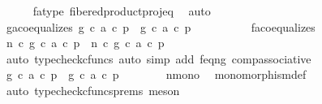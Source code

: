 \begin{isabellebody}
\ \ \ \ \isamarkupfalse%
\ fa{\isacharunderscore}{\kern0pt}type\ fibered{\isacharunderscore}{\kern0pt}product{\isacharunderscore}{\kern0pt}proj{\isacharunderscore}{\kern0pt}eq\ \isamarkupfalse%
\ auto\isanewline
\ \ \isamarkupfalse%
\ ga{\isacharunderscore}{\kern0pt}coequalizes{\isacharcolon}{\kern0pt}\ {\isachardoublequoteopen}{\isacharparenleft}{\kern0pt}g\ {\isasymcirc}\isactrlsub c\ a{\isacharparenright}{\kern0pt}\ {\isasymcirc}\isactrlsub c\ p{}\ {\isacharequal}{\kern0pt}\ {\isacharparenleft}{\kern0pt}g\ {\isasymcirc}\isactrlsub c\ a{\isacharparenright}{\kern0pt}\ {\isasymcirc}\isactrlsub c\ p{}{\isachardoublequoteclose}\isanewline
\ \ \isamarkupfalse%
\ {\isacharminus}{\kern0pt}\isanewline
\ \ \ \ \isamarkupfalse%
\ fa{\isacharunderscore}{\kern0pt}coequalizes\ \isamarkupfalse%
\ {\isachardoublequoteopen}n\ {\isasymcirc}\isactrlsub c\ {\isacharparenleft}{\kern0pt}{\isacharparenleft}{\kern0pt}g\ {\isasymcirc}\isactrlsub c\ a{\isacharparenright}{\kern0pt}\ {\isasymcirc}\isactrlsub c\ p{}{\isacharparenright}{\kern0pt}\ {\isacharequal}{\kern0pt}\ n\ {\isasymcirc}\isactrlsub c\ {\isacharparenleft}{\kern0pt}{\isacharparenleft}{\kern0pt}g\ {\isasymcirc}\isactrlsub c\ a{\isacharparenright}{\kern0pt}\ {\isasymcirc}\isactrlsub c\ p{}{\isacharparenright}{\kern0pt}{\isachardoublequoteclose}\isanewline
\ \ \ \ \ \ \isamarkupfalse%
\ {\isacharparenleft}{\kern0pt}auto{\isacharcomma}{\kern0pt}\ typecheck{\isacharunderscore}{\kern0pt}cfuncs{\isacharcomma}{\kern0pt}\ auto\ simp\ add{\isacharcolon}{\kern0pt}\ f{\isacharunderscore}{\kern0pt}eq{\isacharunderscore}{\kern0pt}ng\ comp{\isacharunderscore}{\kern0pt}associative{}{\isacharparenright}{\kern0pt}\isanewline
\ \ \ \ \isamarkupfalse%
\ \isamarkupfalse%
\ {\isachardoublequoteopen}{\isacharparenleft}{\kern0pt}g\ {\isasymcirc}\isactrlsub c\ a{\isacharparenright}{\kern0pt}\ {\isasymcirc}\isactrlsub c\ p{}\ {\isacharequal}{\kern0pt}\ {\isacharparenleft}{\kern0pt}g\ {\isasymcirc}\isactrlsub c\ a{\isacharparenright}{\kern0pt}\ {\isasymcirc}\isactrlsub c\ p{}{\isachardoublequoteclose}\isanewline
\ \ \ \ \ \ \isamarkupfalse%
\ n{\isacharunderscore}{\kern0pt}mono\ \isamarkupfalse%
\ monomorphism{\isacharunderscore}{\kern0pt}def{}\ \isamarkupfalse%
\ {\isacharparenleft}{\kern0pt}auto{\isacharcomma}{\kern0pt}\ typecheck{\isacharunderscore}{\kern0pt}cfuncs{\isacharunderscore}{\kern0pt}prems{\isacharcomma}{\kern0pt}\ meson{\isacharparenright}{\kern0pt}\isanewline

\end{isabellebody}
